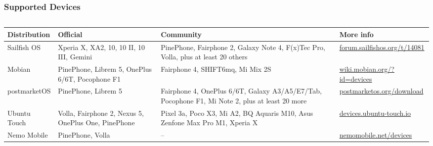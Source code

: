 \documentclass[
	notes=none,
	aspectratio=169
]{beamer}
\begin{document}
\begin{frame}
\frametitle{Supported Devices}

\begin{columns}[T]
\begin{column}[T]{1.0\textwidth}
\setlength{\parskip}{0.5em}



\begin{tabular}{L{1.5cm}|L{3cm}|L{4.5cm}|L{2.7cm}} \hline
{}
{\bf Distribution} & {\bf Official} & {\bf Community} & {\bf More info} \\ \hline
Sailfish OS & Xperia X, XA2, 10, 10 II, 10 III, Gemini & PinePhone, Fairphone 2, Galaxy Note 4, F(x)Tec Pro, Volla, plus at least 20 others & \href{https://forum.sailfishos.org/t/community-hardware-adaptations/14081}{forum.sailfishos.org/t/14081} \\
Mobian & PinePhone, Librem 5, OnePlus 6/6T, Pocophone F1 & Fairphone 4, SHIFT6mq, Mi Mix 2S & \href{https://wiki.mobian.org/?id=devices}{wiki.mobian.org/?id=devices} \\
postmarketOS & PinePhone, Librem 5 & Fairphone 4, OnePlus 6/6T, Galaxy A3/A5/E7/Tab, Pocophone F1, Mi Note 2, plus at least 20 more & \href{https://postmarketos.org/download/}{postmarketos.org/download} \\
Ubuntu Touch & Volla, Fairphone 2, Nexus 5, OnePlus One, PinePhone & Pixel 3a, Poco X3, Mi A2, BQ Aquaris M10, Asus Zenfone Max Pro M1, Xperia X & \href{https://devices.ubuntu-touch.io/}{devices.ubuntu-touch.io} \\
Nemo Mobile & PinePhone, Volla & -- & \href{https://nemomobile.net/devices/}{nemomobile.net/devices} \\ \hline
\end{tabular}


\end{column}
\end{columns}

\end{frame}
\note{
}

\end{document}

